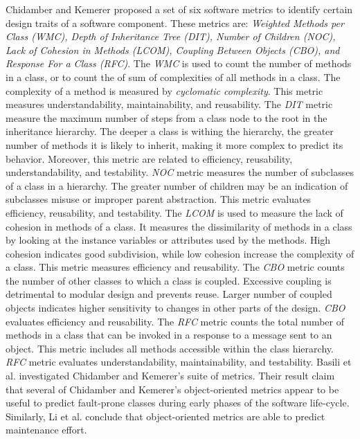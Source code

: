 Chidamber and Kemerer\cite{chidamber1994metrics} proposed a set of six software metrics to identify certain design traits of a software component. These metrics are: \textit{Weighted Methods per Class (WMC), Depth of Inheritance Tree (DIT), Number of Children (NOC), Lack of Cohesion in Methods (LCOM), Coupling Between Objects (CBO), and Response For a Class (RFC)}. The \textit{WMC} is used to count the number of methods in a class, or to count the of sum of complexities of all methods in a class. The complexity of a method is measured by \textit{cyclomatic complexity}. This metric measures understandability, maintainability, and reusability\cite{quenelobject}. The \textit{DIT} metric measure the maximum number of steps from a class node to the root in the inheritance hierarchy. The deeper a class is withing the hierarchy, the greater number of methods it is likely to inherit, making it more complex to predict its behavior\cite{quenelobject}. Moreover, this metric are related to efficiency, reusability, understandability, and testability\cite{quenelobject}. \textit{NOC} metric measures the number of subclasses of a class in a hierarchy. The greater number of children may be an indication of subclasses misuse or improper parent abstraction. This metric evaluates efficiency, reusability, and testability\cite{quenelobject}. The \textit{LCOM} is used to measure the lack of cohesion in methods of a class. It measures the dissimilarity of methods in a class by looking at the instance variables or attributes used by the methods. High cohesion indicates good subdivision, while low cohesion increase the complexity of a class. This metric measures efficiency and reusability\cite{quenelobject}. The \textit{CBO} metric counts the number of other classes to which a class is coupled. Excessive coupling is detrimental to modular design and prevents reuse\cite{quenelobject}. Larger number of coupled objects indicates higher sensitivity to changes in other parts of the design. \textit{CBO} evaluates efficiency and reusability\cite{quenelobject}. The \textit{RFC} metric counts the total number of methods in a class that can be invoked in a response to a message sent to an object. This metric includes all methods accessible within the class hierarchy. \textit{RFC} metric evaluates understandability, maintainability, and testability\cite{quenelobject}. Basili et al.\cite{basili1996validation} investigated Chidamber and Kemerer's suite of metrics. Their result claim that several of Chidamber and Kemerer's object-oriented metrics appear to be useful to predict fault-prone classes during early phases of the software life-cycle. Similarly, Li et al.\cite{li1993object} conclude that object-oriented metrics are able to predict maintenance effort.




